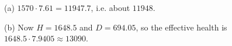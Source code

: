 (a) $1570\cdot7.61=\boxed{11947.7}$, i.e. about $11948$.

(b) Now $H=1648.5$ and $D=694.05$, so the effective health is $1648.5\cdot7.9405\approx\boxed{13090}$.
